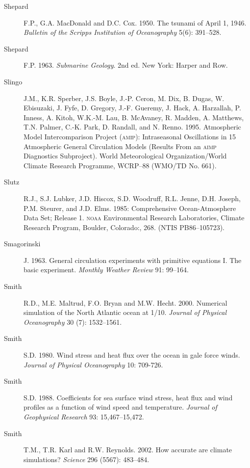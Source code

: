 \begin{description}
\item [Shepard]F.P., G.A. MacDonald and D.C. Cox. 1950. The tsunami of April 1, 1946. \textit{Bulletin of the Scripps Institution of Oceanography} 5(6): 391--528.

\item [Shepard]F.P. 1963. \textit{Submarine Geology}. 2nd ed. New York: Harper and Row.

\item [Slingo]J.M., K.R. Sperber, J.S. Boyle, J.-P. Ceron, M. Dix, B. Dugas, W. Ebisuzaki, J. Fyfe, D. Gregory, J.-F. Gueremy, J. Hack, A. Harzallah, P. Inness, A. Kitoh, W.K.-M. Lau, B. McAvaney, R. Madden, A. Matthews, T.N. Palmer, C.-K. Park, D. Randall, and N. Renno. 1995. Atmospheric Model Intercomparison Project (\textsc{amip}): Intraseasonal Oscillations in 15 Atmospheric General Circulation Models (Results From an \textsc{aimp} Diagnostics Subproject). World Meteorological Organization/World Climate Research Programme, WCRP--88 (WMO/TD No. 661).

\item [Slutz]R.J., S.J. Lubker, J.D. Hiscox, S.D. Woodruff, R.L. Jenne, D.H. Joseph, P.M. Steurer, and J.D. Elms. 1985: Comprehensive Ocean-Atmosphere Data Set; Release 1. \textsc{noaa} Environmental Research Laboratories, Climate Research Program, Boulder, Colorado:, 268. (NTIS PB86--105723).

\item [Smagorinski]J. 1963. General circulation experiments with primitive
equations I. The basic experiment. \textit{Monthly Weather Review} 91: 99--164.

\item [Smith]R.D., M.E. Maltrud, F.O. Bryan and M.W. Hecht. 2000. Numerical simulation of the North Atlantic ocean at 1/10\degrees. \textit{Journal of Physical Oceanography} 30 (7): 1532--1561.

\item [Smith]S.D. 1980. Wind stress and heat flux over the ocean in gale force winds. \textit{Journal of Physical Oceanography} 10: 709-726.
	
\item [Smith]S.D. 1988. Coefficients for sea surface wind stress, heat flux and wind profiles as a function of wind speed and temperature. \textit{Journal of Geophysical Research} 93: 15,467--15,472.

\item [Smith]T.M., T.R. Karl and R.W. Reynolds. 2002. How accurate are climate simulations? \textit{Science} 296 (5567): 483--484.


\end{description}
